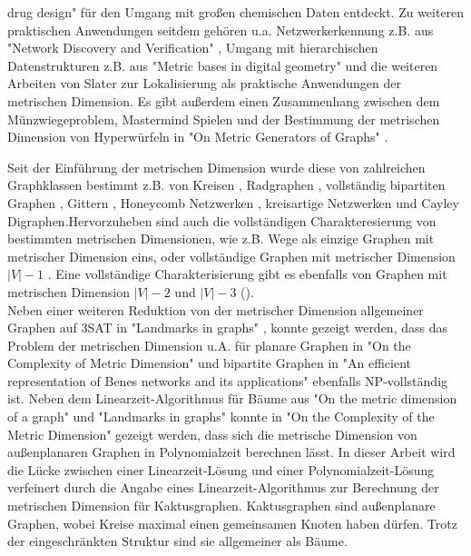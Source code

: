 drug design" \cite{drug} für den Umgang mit großen chemischen Daten entdeckt. Zu weiteren praktischen Anwendungen seitdem gehören u.a. Netzwerkerkennung z.B. aus "Network Discovery and Verification" \cite{netzwerk}, Umgang mit hierarchischen Datenstrukturen z.B. aus "Metric bases in digital geometry" \cite{hier} und die weiteren Arbeiten von Slater zur Lokalisierung als praktische Anwendungen der metrischen Dimension. Es gibt außerdem einen Zusammenhang zwischen dem Münzwiegeproblem, Mastermind Spielen und der Bestimmung der metrischen Dimension von Hyperwürfeln in "On Metric Generators of Graphs" \cite{tannier}.\newpage

Seit der Einführung der metrischen Dimension wurde diese von zahlreichen Graphklassen bestimmt z.B. von Kreisen \cite{landmarks}, Radgraphen \cite{wheel}, vollständig bipartiten Graphen \cite{upper}, Gittern \cite{landmarks}, Honeycomb Netzwerken \cite{honey}, kreisartige Netzwerken \cite{circulant} und Cayley Digraphen\cite{cayley}.\vspace{-1mm}\newline\newline Hervorzuheben sind auch die vollständigen Charakteresierung von bestimmten metrischen Dimensionen, wie z.B. Wege als einzige Graphen mit metrischer Dimension eins\cite{landmarks}, oder vollständige Graphen mit metrischer Dimension $|V|-1$ \cite{upper}. 
Eine vollständige Charakterisierung gibt es ebenfalls von Graphen mit metrischen Dimension $|V|-2$ \cite{upper} und $|V|-3$ (\cite{n-31,n-32}).\\
Neben einer weiteren Reduktion von der metrischer Dimension allgemeiner Graphen auf 3SAT in "Landmarks in graphs" \cite{landmarks}, konnte gezeigt werden, dass das Problem der metrischen Dimension u.A. für planare Graphen in "On the Complexity of Metric Dimension" \cite{aussenplanar} und bipartite Graphen in "An efficient representation of Benes networks and its applications" \cite{bipartitnp} ebenfalls NP-vollständig ist. 
Neben dem Linearzeit-Algorithmus für Bäume aus "On the metric dimension of a graph" \cite{harary} und "Landmarks in graphs" \cite{landmarks} konnte in "On the Complexity of the Metric Dimension" \cite{aussenplanar} gezeigt werden, dass sich die metrische Dimension von außenplanaren Graphen in Polynomialzeit berechnen lässt.\vspace{-1mm}\newline\newline
In dieser Arbeit wird die Lücke zwischen einer Linearzeit-Lösung und einer Polynomialzeit-Lösung verfeinert durch die Angabe eines Linearzeit-Algorithmus zur Berechnung der metrischen Dimension für Kaktusgraphen. Kaktusgraphen sind außenplanare Graphen, wobei Kreise maximal einen gemeinsamen Knoten haben dürfen. Trotz der eingeschränkten Struktur sind sie allgemeiner als Bäume.
